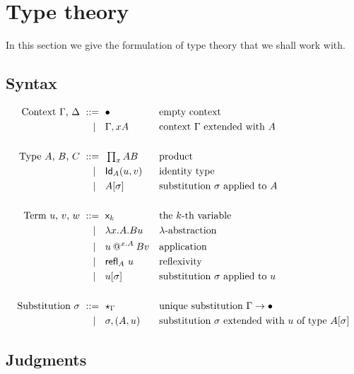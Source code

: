 \section{Type theory}
\label{sec:type-theory}

In this section we give the formulation of type theory that we shall work with.

\subsection{Syntax}
\label{sec:syntax}

\begin{align*}
  \text{Context $\Gamma$, $\Delta$}
    \ \mathrel{{:}{:}{=}}\    {}& \bullet                    && \text{empty context} \\
    \ \mid\ \  {}& \Gamma, x{A}       && \text{context $\Gamma$ extended with $A$} \\
  \\
  \text{Type $A$, $B$, $C$}
    \ \mathrel{{:}{:}{=}}\    {}& \mathop{\textstyle\prod_{x}}{A} B              && \text{product}\\
    \ \mid\ \  {}& \mathsf{Id}_{A}(u,v)            && \text{identity type} \\
    \ \mid\ \  {}& A[\sigma]             && \text{substitution $\sigma$ applied to $A$} \\
  \\
  \text{Term $u$, $v$, $w$}
    \ \mathrel{{:}{:}{=}}\    {}& \mathsf{x}_{k}                      && \text{the $k$-th variable} \\
    \ \mid\ \  {}& \lambda x . A .{B} u         && \text{$\lambda$-abstraction} \\
    \ \mid\ \  {}& u\mathbin{@^{x.A}} B{v}   && \text{application} \\
    \ \mid\ \  {}& {\mathsf{refl}_{A}}\  u                && \text{reflexivity} \\
    \ \mid\ \  {}& u[\sigma]            && \text{substitution $\sigma$ applied to $u$} \\
  \\
  \text{Substitution $\sigma$}
    \ \mathrel{{:}{:}{=}}\    {}& \mathsf{\star}_{\Gamma}                  && \text{unique substitution $\Gamma \to \bullet$} \\
    \ \mid\ \  {}& \sigma,(A,u) && \text{substitution $\sigma$ extended with $u$ of type $A[\sigma]$}
\end{align*}

\subsection{Judgments}
\label{sec:judgments}

